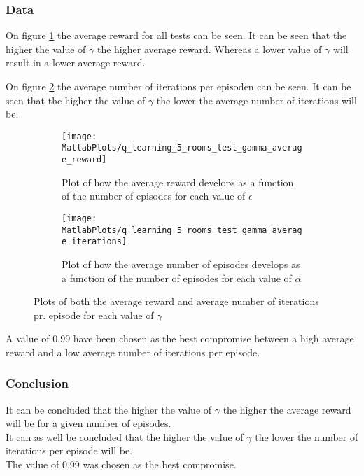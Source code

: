 \documentclass[../Head/Main.tex]{subfiles}
\begin{document}
\clearpage
\subsubsection*{Data}
On figure \ref{fig:q-learn_gamma_reward} the average reward for all tests can be seen. It can be seen that the higher the value of $\gamma$ the higher average reward. Whereas a lower value of $\gamma$ will result in a lower average reward.\par
On figure \ref{fig:q-learn_gamma_iterations} the average number of iterations per episoden can be seen. It can be seen that the higher the value of $\gamma$ the lower the average number of iterations will be.
\begin{figure}[H]
	\centering
	\begin{subfigure}[b]{0.49\textwidth}
		\centering
		\texttt{[image: MatlabPlots/q\_learning\_5\_rooms\_test\_gamma\_average\_reward]}
		\caption{Plot of how the average reward develops as a function of the number of episodes for each value of $\epsilon$}
		\label{fig:q-learn_gamma_reward}
	\end{subfigure}
	\hfill
	\begin{subfigure}[b]{0.49\textwidth}
		\centering
		\texttt{[image: MatlabPlots/q\_learning\_5\_rooms\_test\_gamma\_average\_iterations]}
		\caption{Plot of how the average number of episodes develops as a function of the number of episodes for each value of $\alpha$}
		\label{fig:q-learn_gamma_iterations}
	\end{subfigure}
	\caption{Plots of both the average reward and average number of iterations pr. episode for each value of $\gamma$}
	\label{fig:q-learn_gamma}
\end{figure}
A value of 0.99 have been chosen as the best compromise between a high average reward and a low average number of iterations per episode.

\subsubsection*{Conclusion}
It can be concluded that the higher the value of $\gamma$ the higher the average reward will be for a given number of episodes.\\
It can as well be concluded that the higher the value of $\gamma$ the lower the number of iterations per episode will be.\\ 
The value of 0.99 was chosen as the best compromise.
\end{document}
